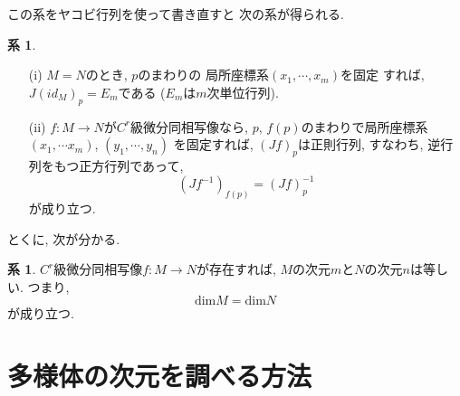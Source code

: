 \documentclass[a4j,12pt]{jarticle}
\theoremstyle{definition}
\newtheorem{corollary}[theorem]{系}
\begin{document}
この系をヤコビ行列を使って書き直すと
次の系が得られる. 
\begin{corollary}
    \begin{itemize}
        \item[(i)]$M=N$のとき, $p$のまわりの
        局所座標系$(x_1,\cdots ,x_m)$を固定
        すれば, $J(id_M)_p=E_m$である
        ($E_m$は$m$次単位行列). 
        \item[(ii)]
        $f:M\to N$が$C^r$級微分同相写像なら, 
        $p$, $f(p)$のまわりで局所座標系
        $(x_1,\cdots x_m)$, $(y_1,\cdots ,y_n)$
        を固定すれば, $(Jf)_p$は正則行列, 
        すなわち, 逆行列をもつ正方行列であって, 
        $$(Jf^{-1})_{f(p)}=(Jf)_p^{-1}$$
        が成り立つ. 
    \end{itemize}
\end{corollary}
とくに, 次が分かる. 
\begin{corollary}\label{coro:dim equality by diffeomorphism}
    $C^r$級微分同相写像$f:M\to N$が存在すれば, 
    $M$の次元$m$と$N$の次元$n$は等しい. つまり, 
    $$\text{dim}M=\text{dim}N$$
    が成り立つ. 
\end{corollary}
\newpage


\section{多様体の次元を調べる方法}
\end{document}
